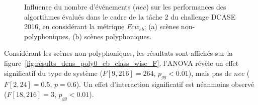 \begin{figure}[t]
        \myfloatalign
        \par
        \par
       \caption[Influence du nombre d'événements ($nec$) sur les performances des algortihmes évalués dans le cadre de la tâche 2 du challenge DCASE 2016, en considérant la métrique $Fcw_{eb}$]{Influence du nombre d'événements ($nec$) sur les performances des algortihmes évalués dans le cadre de la tâche 2 du challenge DCASE 2016, en considérant la métrique $Fcw_{eb}$; (a) scènes non-polyphoniques, (b) scènes polyphoniques.}\label{fig:results_dens_eb_class_wise_F}
\end{figure}

Considérant les scènes non-polyphoniques, les résultats sont affichés sur la figure~\ref{fig:results_dens_poly0_eb_class_wise_F}. l'ANOVA révèle un effet significatif du type de système ($F[9,216]=264$, $p_{gg}<0.01$), mais pas de $nec$ ($F[2,24]=0.5$, $p=0.6$). Un effet d'interaction significatif est néanmoins observé ($F[18,216]=3$, $p_{gg}<0.01$).

